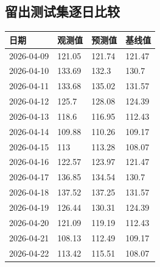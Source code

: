 \documentclass[UTF8,a4paper,11pt,fontset=fandol]{ctexart}
\begin{document}
\subsection*{留出测试集逐日比较}
{\small
\begin{longtable}{llll}
\toprule
日期 & 观测值 & 预测值 & 基线值 \\ 
\midrule\endhead

2026-04-09 & 121.05 & 121.74 & 121.47 \\ 

2026-04-10 & 133.69 & 132.3 & 130.7 \\ 

2026-04-11 & 133.68 & 135.02 & 131.57 \\ 

2026-04-12 & 125.7 & 128.08 & 124.39 \\ 

2026-04-13 & 118.6 & 116.95 & 112.43 \\ 

2026-04-14 & 109.88 & 110.26 & 109.17 \\ 

2026-04-15 & 113 & 113.28 & 108.07 \\ 

2026-04-16 & 122.57 & 123.97 & 121.47 \\ 

2026-04-17 & 136.85 & 134.54 & 130.7 \\ 

2026-04-18 & 137.52 & 137.25 & 131.57 \\ 

2026-04-19 & 126.44 & 130.31 & 124.39 \\ 

2026-04-20 & 121.09 & 119.19 & 112.43 \\ 

2026-04-21 & 108.13 & 112.49 & 109.17 \\ 

2026-04-22 & 113.42 & 115.51 & 108.07 \\ 

\bottomrule
\end{longtable}}

\end{document}
